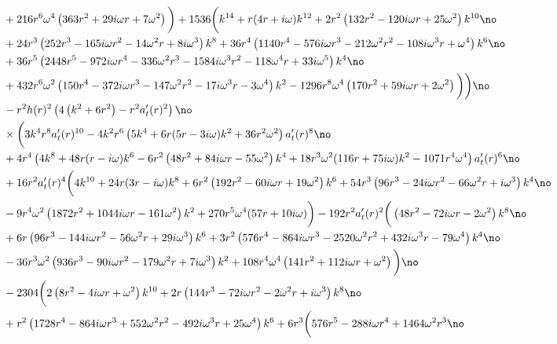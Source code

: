 \documentclass[preprintnumbers,aps,prd,longbibliography,nofootinbib,nobibnotes,amsmath,amssymb]{revtex4}
\begin{document}
		\begin{align}
		&+216 r^6 \omega ^4 \left(363 r^2+29 i \omega  r+7 \omega ^2\right)\bigg) +1536 \bigg(k^{14}+r (4 r+i \omega ) k^{12}+2 r^2 \left(132 r^2-120 i \omega  r+25 \omega ^2\right) k^{10}\no\\
		&+24 r^3 \left(252 r^3-165 i \omega  r^2-14 \omega ^2 r+8 i \omega ^3\right) k^8+36 r^4 \left(1140 r^4-576 i \omega  r^3-212 \omega ^2 r^2-108 i \omega ^3 r+\omega ^4\right) k^6\no\\
		&+36 r^5 \left(2448 r^5-972 i \omega  r^4-336 \omega ^2 r^3-1584 i \omega ^3 r^2-118 \omega ^4 r+33 i \omega ^5\right) k^4\no\\
		&+432 r^6 \omega ^2 \left(150 r^4-372 i \omega  r^3-147 \omega ^2 r^2-17 i \omega ^3 r-3 \omega ^4\right) k^2-1296 r^8 \omega ^4 \left(170 r^2+59 i \omega  r+2 \omega ^2\right)\bigg)\bigg)\no\\
		& -r^2 h(r)^2 \left(4 \left(k^2+6 r^2\right)-r^2 a_t'(r){}^2\right) \no\\
		&\times\bigg(3 k^4 r^8 a_t'(r)^{10}-4 k^2 r^6 \left(5 k^4+6 r (5 r-3 i \omega ) k^2+36 r^2 \omega ^2\right) a_t'(r)^8\no\\
		&+4 r^4 \left(4 k^8+48 r (r-i \omega ) k^6-6 r^2 \left(48 r^2+84 i \omega  r-55 \omega ^2\right) k^4+18 r^3 \omega ^2 (116 r+75 i \omega ) k^2-1071 r^4 \omega ^4\right) a_t'(r)^6\no\\
		&+16 r^2 a_t'(r)^4 \bigg(4 k^{10}+24 r (3 r-i \omega ) k^8+6 r^2 \left(192 r^2-60 i \omega  r+19 \omega ^2\right) k^6+54 r^3 \left(96 r^3-24 i \omega  r^2-66 \omega ^2 r+i \omega ^3\right) k^4\no\\
		&-9 r^4 \omega ^2 \left(1872 r^2+1044 i \omega  r-161 \omega ^2\right) k^2+270 r^5 \omega ^4 (57 r+10 i \omega )\bigg) -192 r^2 a_t'(r)^2\bigg(\left(48 r^2-72 i \omega  r-2 \omega ^2\right) k^8\no\\
		&+6 r \left(96 r^3-144 i \omega  r^2-56 \omega ^2 r+29 i \omega ^3\right) k^6+3 r^2 \left(576 r^4-864 i \omega  r^3-2520 \omega ^2 r^2+432 i \omega ^3 r-79 \omega ^4\right) k^4\no\\
		&-36 r^3 \omega ^2 \left(936 r^3-90 i \omega  r^2-179 \omega ^2 r+7 i \omega ^3\right) k^2+108 r^4 \omega ^4 \left(141 r^2+112 i \omega  r+\omega ^2\right)\bigg)\no\\
		& -2304 \bigg(2 \left(8 r^2-4 i \omega  r+\omega ^2\right) k^{10}+2 r \left(144 r^3-72 i \omega  r^2-2 \omega ^2 r+i \omega ^3\right) k^8\no\\
		&+r^2 \left(1728 r^4-864 i \omega  r^3+552 \omega ^2 r^2-492 i \omega ^3 r+25 \omega ^4\right) k^6+6 r^3 \bigg(576 r^5-288 i \omega  r^4+1464 \omega ^2 r^3\no\\

\end{align}
\end{document}
